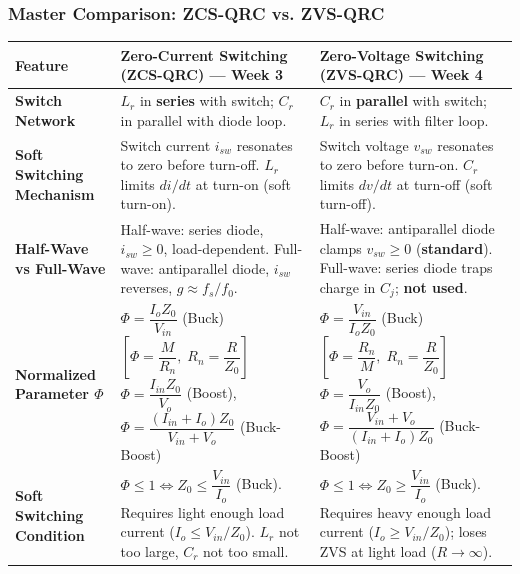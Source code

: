 \subsubsection*{Master Comparison: ZCS-QRC vs. ZVS-QRC}
\vspace{-4pt}
\begin{center}
\vspace{-6pt}
\footnotesize
\renewcommand{\arraystretch}{1.15}
\begin{tabularx}{\textwidth}{@{} >{\raggedright\arraybackslash}p{2.6cm} >{\raggedright\arraybackslash}X >{\raggedright\arraybackslash}X @{}}
\toprule
\textbf{Feature} & \textbf{Zero-Current Switching (ZCS-QRC) --- Week 3} & \textbf{Zero-Voltage Switching (ZVS-QRC) --- Week 4} \\
\midrule
\textbf{Switch Network} &
$L_r$ in \textbf{series} with switch; $C_r$ in parallel with diode loop. &
$C_r$ in \textbf{parallel} with switch; $L_r$ in series with filter loop. \\

\textbf{Soft Switching Mechanism} &
Switch current $i_{sw}$ resonates to zero before turn-off. $L_r$ limits $di/dt$ at turn-on (soft turn-on). &
Switch voltage $v_{sw}$ resonates to zero before turn-on. $C_r$ limits $dv/dt$ at turn-off (soft turn-off). \\

\textbf{Half-Wave vs Full-Wave} &
Half-wave: series diode, $i_{sw} \ge 0$, load-dependent. \newline
Full-wave: antiparallel diode, $i_{sw}$ reverses, $g \approx f_s/f_0$. &
Half-wave: antiparallel diode clamps $v_{sw} \ge 0$ (\textbf{standard}). \newline
Full-wave: series diode traps charge in $C_j$; \textbf{not used}. \\

\textbf{Normalized Parameter $\Phi$} &
$\Phi = \dfrac{I_o Z_0}{V_{in}}$ (Buck) \quad $\left[\Phi = \dfrac{M}{R_n}, \; R_n = \dfrac{R}{Z_0}\right]$ \newline
$\Phi = \dfrac{I_{in} Z_0}{V_o}$ (Boost), \quad $\Phi = \dfrac{(I_{in}+I_o)Z_0}{V_{in}+V_o}$ (Buck-Boost) &
$\Phi = \dfrac{V_{in}}{I_o Z_0}$ (Buck) \quad $\left[\Phi = \dfrac{R_n}{M}, \; R_n = \dfrac{R}{Z_0}\right]$ \newline
$\Phi = \dfrac{V_o}{I_{in} Z_0}$ (Boost), \quad $\Phi = \dfrac{V_{in}+V_o}{(I_{in}+I_o)Z_0}$ (Buck-Boost) \\

\textbf{Soft Switching Condition} &
$\Phi \le 1 \iff Z_0 \le \dfrac{V_{in}}{I_o}$ (Buck). Requires light enough load current ($I_o \le V_{in}/Z_0$). $L_r$ not too large, $C_r$ not too small. &
$\Phi \le 1 \iff Z_0 \ge \dfrac{V_{in}}{I_o}$ (Buck). Requires heavy enough load current ($I_o \ge V_{in}/Z_0$); loses ZVS at light load ($R \to \infty$). \\


\end{tabularx}
\end{center}
